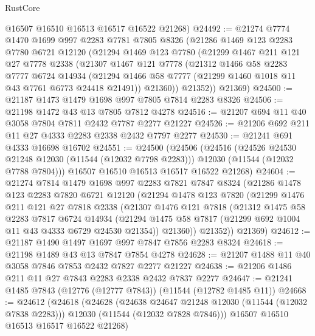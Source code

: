 \begin{lexlean}{RustCore}
\begin{coremodule}
      @16507
      @16510
      @16513
      @16517
      @16522
      @21268)
@24492 := @21274
    @7774
    @1470
    @1699
    @997
    @2283
    @7781
    @7805
    @8326
    (@21286
      @1469
      @123
      @2283
      @7780
      @6721
      @12120
      (@21294
        @1469
        @123
        @7780
        (@21299
          @1467
          @211
          @121
          @27
          @7778
          @2338
          (@21307
            @1467
            @121
            @7778
            (@21312
              @1466
              @58
              @2283
              @7777
              @6724
              @14934
              (@21294 @1466 @58 @7777 (@21299 @1460 @1018 @11 @43 @7761 @6773 @24418 @21491))
              @21360))
          @21352))
      @21369)
@24500 := @21187 @1473 @1479 @1698 @997 @7805 @7814 @2283 @8326
@24506 := @21198 @1472 @43 @13 @7805 @7812 @4278
@24516 := @21207 @694 @11 @40 @3058 @7804 @7811 @2432 @7787 @2277 @21227
@24526 := @21206 @692 @211 @11 @27 @4333 @2283 @2338 @2432 @7797 @2277
@24530 := @21241 @691 @4333 @16698 @16702
@24551 := @24500
    (@24506
      (@24516
        (@24526 @24530 @21248 @12030 (@11544 (@12032 @7798 @2283)))
        @12030
        (@11544 (@12032 @7788 @7804)))
      @16507
      @16510
      @16513
      @16517
      @16522
      @21268)
@24604 := @21274
    @7814
    @1479
    @1698
    @997
    @2283
    @7821
    @7847
    @8324
    (@21286
      @1478
      @123
      @2283
      @7820
      @6721
      @12120
      (@21294
        @1478
        @123
        @7820
        (@21299
          @1476
          @211
          @121
          @27
          @7818
          @2338
          (@21307
            @1476
            @121
            @7818
            (@21312
              @1475
              @58
              @2283
              @7817
              @6724
              @14934
              (@21294 @1475 @58 @7817 (@21299 @692 @1004 @11 @43 @4333 @6729 @24530 @21354))
              @21360))
          @21352))
      @21369)
@24612 := @21187 @1490 @1497 @1697 @997 @7847 @7856 @2283 @8324
@24618 := @21198 @1489 @43 @13 @7847 @7854 @4278
@24628 := @21207 @1488 @11 @40 @3058 @7846 @7853 @2432 @7827 @2277 @21227
@24638 := @21206 @1486 @211 @11 @27 @7843 @2283 @2338 @2432 @7837 @2277
@24647 := @21241 @1485 @7843 (@12776 (@12777 @7843)) (@11544 (@12782 @1485 @11))
@24668 := @24612
    (@24618
      (@24628
        (@24638 @24647 @21248 @12030 (@11544 (@12032 @7838 @2283)))
        @12030
        (@11544 (@12032 @7828 @7846)))
      @16507
      @16510
      @16513
      @16517
      @16522
      @21268)

\end{coremodule}
\end{lexlean}
